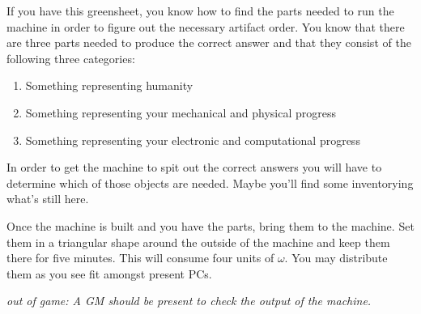 \documentclass[green]{guildcamp3}
\begin{document}
\name{\gAddPartsTech{}}

If you have this greensheet, you know how to find the parts needed to run the machine in order to figure out the necessary artifact order. You know that there are three parts needed to produce the correct answer and that they consist of the following three categories:

\begin{enumerate}
	\item Something representing humanity
	\item Something representing your mechanical and physical progress
	\item Something representing your electronic and computational progress
\end{enumerate}

In order to get the machine to spit out the correct answers you will have to determine which of those objects are needed. Maybe you'll find some inventorying what's still here. 

Once the machine is built and you have the parts, bring them to the machine. Set them in a triangular shape around the outside of the machine and keep them there for five minutes. This will consume four units of $\omega$. You may distribute them as you see fit amongst present PCs.

\emph{out of game: A GM should be present to check the output of the machine.}

\end{document}
